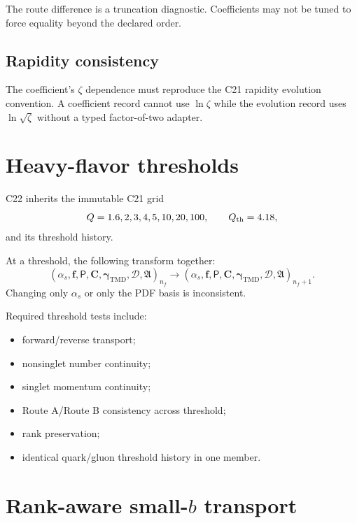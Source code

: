 \documentclass[11pt]{article}
\newcommand{\TMD}{\mathrm{TMD}}
\newcommand{\cD}{\mathcal D}
\newcommand{\as}{\alpha_s}
\begin{document}
The route difference is a truncation diagnostic.  Coefficients may not be tuned to force equality beyond the declared order.

\subsection{Rapidity consistency}

The coefficient's \(\zeta\) dependence must reproduce the C21 rapidity evolution convention.  A coefficient record cannot use \(\ln\zeta\) while the evolution record uses \(\ln\sqrt\zeta\) without a typed factor-of-two adapter.

\section{Heavy-flavor thresholds}
\label{sec:thresholds}

C22 inherits the immutable C21 grid
\begin{equation}
 Q=1.6,2,3,4,5,10,20,100,
 \qquad Q_{\rm th}=4.18,
 \label{eq:q-grid}
\end{equation}
and its threshold history.

At a threshold, the following transform together:
\begin{equation}
 \left(
 \as,
 \bm f,
 \bm{\mathsf P},
 \bm C,
 \bm\gamma_{\TMD},
 \cD,
 \mathfrak A
 \right)_{n_f}
 \longrightarrow
 \left(
 \as,
 \bm f,
 \bm{\mathsf P},
 \bm C,
 \bm\gamma_{\TMD},
 \cD,
 \mathfrak A
 \right)_{n_f+1}.
 \label{eq:threshold-bundle}
\end{equation}
Changing only \(\as\) or only the PDF basis is inconsistent.

Required threshold tests include:
\begin{itemize}
\item forward/reverse transport;
\item nonsinglet number continuity;
\item singlet momentum continuity;
\item Route A/Route B consistency across threshold;
\item rank preservation;
\item identical quark/gluon threshold history in one member.
\end{itemize}

\section{Rank-aware small-\texorpdfstring{\(b\)}{b} transport}
\label{sec:rank}
\end{document}
